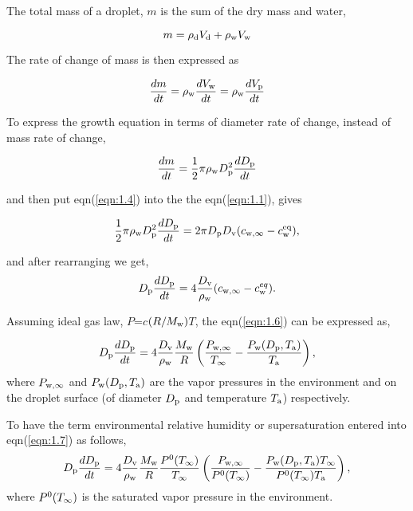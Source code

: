 \documentclass[12pt]{article}
\begin{document}
The total mass of a droplet, $m$ is the sum of the dry mass and water,

\begin{equation}\label{eqn:1.2}
m=\rho_{\rm d}V_{\rm d}+\rho_{\rm w}V_{\rm w}
\end{equation}
 
The rate of change of mass is then expressed as

\begin{equation}\label{eqn:1.3}
\frac{dm}{dt}=\rho_{\rm w} \frac{dV_{\rm w}}{dt}=\rho_{\rm w} \frac{dV_{\rm p}}{dt}  
\end{equation}

To express the growth equation in terms of diameter rate of change, instead of mass rate of change,

\begin{equation}\label{eqn:1.4}
\frac{dm}{dt}=\frac{1}{2} \pi \rho_{\rm w} D_{\rm p}^{2} \frac{dD_{\rm p}}{dt}
\end{equation}

and then put eqn(\ref{eqn:1.4}) into the the eqn(\ref{eqn:1.1}), gives

\begin{equation}\label{eqn:1.5}
\frac{1}{2} \pi \rho_{\rm w} D_{\rm p}^{2} \frac{dD_{\rm p}}{dt}= 2 \pi D_{\rm p} D_{\rm v} (c_{\rm w, \infty} - c_{\rm w}^{\rm eq}),
\end{equation}

and after rearranging we get, 
\begin{equation}\label{eqn:1.6}
D_{\rm p}\frac{dD_{\rm p}}{dt}=4 \frac{D_{\rm v}} {\rho_{\rm w}} (c_{\rm w, \infty} - c_{\rm w}^{eq}).
\end{equation}

Assuming ideal gas law, $P$=$c$$(R / M_{\rm w})$$T$, the eqn(\ref{eqn:1.6}) can be expressed as,

\begin{equation}\label{eqn:1.7}
D_{\rm p}\frac{dD_{\rm p}}{dt}=4 \frac{D_{\rm v}} {\rho_{\rm w}} \frac{M_{\rm w}}{R} \left(\frac{P_{\rm w, \infty}}{T_{\infty}} - \frac{P_{\rm w}(D_{\rm p}, T_{\rm a})}{T_{\rm a}}\right),
\end{equation}
where $P_{\rm w, \infty}$ and $P_{\rm w}(D_{\rm p}, T_{\rm a})$ are the vapor pressures in the environment and on the droplet surface (of diameter $D_{\rm p}$ and temperature $T_{\rm a}$) respectively.

To have the term environmental relative humidity or supersaturation entered into eqn(\ref{eqn:1.7}) as follows,  
\begin{equation}\label{eqn:1.8}
D_{\rm p}\frac{dD_{\rm p}}{dt}=4  \frac{D_{\rm v}} {\rho_{\rm w}} \frac{M_{\rm w}}{R} \frac{P^{\rm 0}(T_{\infty})} {T_{\infty}} \left(\frac{P_{\rm w, \infty}}{P^{\rm 0}(T_{\infty})} - \frac{P_{\rm w}(D_{\rm p}, T_{\rm a}) T_{\infty}}{P^{\rm 0}(T_{\infty}) T_{\rm a}}\right),
\end{equation}
where $P^{\rm 0}(T_{\infty})$ is the saturated vapor pressure in the environment.
\end{document}
